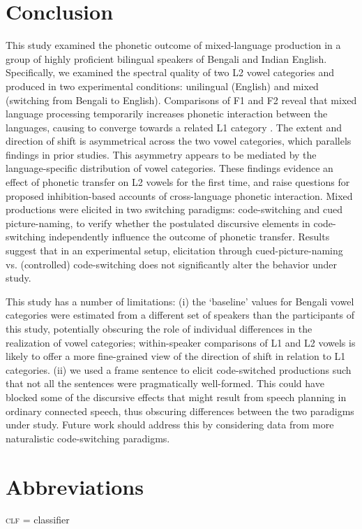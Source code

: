 \documentclass[12 pt]{article}
\newcommand{\nt}[1]{\textipa{[#1]}} %
\begin{document}
\section{Conclusion}
This study examined the phonetic outcome of mixed-language production in a group of highly proficient bilingual speakers of Bengali and Indian English. Specifically, we examined the spectral quality of two L2 vowel categories \nt{2} and \nt{\ae} produced in two experimental conditions: unilingual (English) and mixed (switching from Bengali to English).
Comparisons of F1 and F2 reveal that mixed language processing temporarily increases phonetic interaction between the languages, causing \nt{2} to converge towards a related L1 category \nt{a:}. The extent and direction of shift is asymmetrical across the two vowel categories, which parallels findings in prior studies. This asymmetry appears to be mediated by the language-specific distribution of vowel categories. These findings evidence an effect of phonetic transfer on L2 vowels for the first time, and raise questions for proposed inhibition-based accounts of cross-language phonetic interaction. Mixed productions were elicited in two switching paradigms: code-switching and cued picture-naming, to verify whether the postulated discursive elements in code-switching independently influence the outcome of phonetic transfer. Results suggest that in an experimental setup, elicitation through cued-picture-naming vs. (controlled) code-switching does not significantly alter the behavior under study. 

This study has a number of limitations: (i) the `baseline' values for Bengali vowel categories were estimated from a different set of speakers than the participants of this study, potentially obscuring the role of individual differences in the realization of vowel categories; within-speaker comparisons of L1 and L2 vowels is likely to offer a more fine-grained view of the direction of shift in relation to L1 categories.  (ii) we used a frame sentence to elicit code-switched productions such that not all the sentences were pragmatically well-formed. This could have blocked some of the discursive effects that might result from speech planning in ordinary connected speech, thus obscuring differences between the two paradigms under study. Future work should address this by considering data from more naturalistic code-switching paradigms.     

\section*{Abbreviations}
\textsc{clf} = classifier
\end{document}
